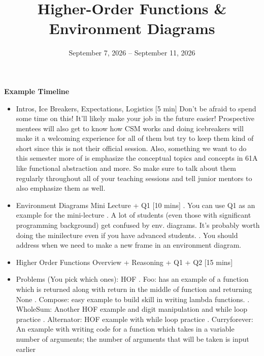 \documentclass{exam}
\title{Higher-Order Functions \& Environment Diagrams}
\date{September 7, 2026 -- September 11, 2026}
\begin{document}
\maketitle

\begin{meta}
    \textbf{Example Timeline}
    \begin{itemize}
        \item Intros, Ice Breakers, Expectations, Logistics [5 min]
        \subitem Don't be afraid to spend some time on this! It'll likely make your job in the future easier! Prospective mentees will also get to know how CSM works and doing icebreakers will make it a welcoming experience for all of them but try to keep them kind of short since this is not their official session.
        \subitem Also, something we want to do this semester more of is emphasize the conceptual topics and concepts in 61A like functional abstraction and more. So make sure to talk about them regularly throughout all of your teaching sessions and tell junior mentors to also emphasize them as well.
        \item Environment Diagrams Mini Lecture + Q1 [10 mins]
        . You can use Q1 as an example for the mini-lecture
        . A lot of students (even those with significant programming background) get confused by env. diagrams. It's probably worth doing the minilecture even if you have advanced students.
        . You should address when we need to make a new frame in an environment diagram.
        \item Higher Order Functions Overview + Reasoning + Q1 + Q2 [15 mins]
        \item Problems (You pick which ones): HOF  
        . Foo: has an example of a function which is returned along with return in the middle of function and returning None
        . Compose: easy example to build skill in writing lambda functions.
        . WholeSum: Another HOF example and digit manipulation and while loop practice
        . Alternator: HOF example with while loop practice
        . Curryforever: An example with writing code for a function which takes in a variable number of arguments; the number of arguments that will be taken is input earlier
    \end{itemize}
\end{meta} 
\end{document}
